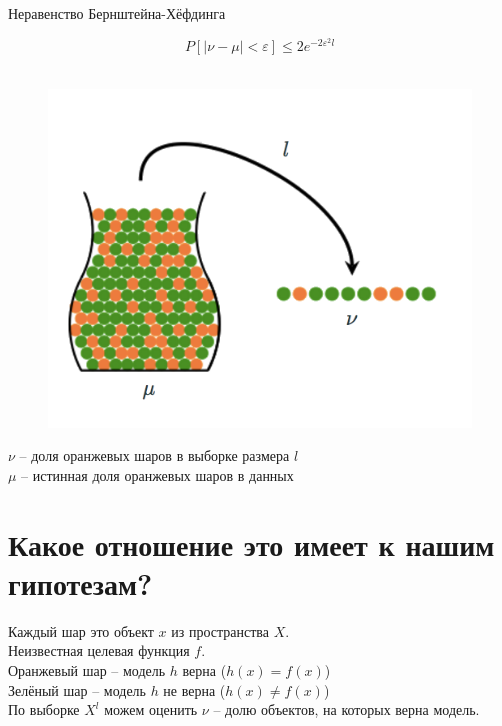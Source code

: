 \documentclass[10pt]{beamer}
\begin{document}
\begin{frame}{Неравенство Бернштейна-Хёфдинга}
  \begin{minipage}[t]{0.5\linewidth}
    $$P[\vert \nu - \mu \vert < \varepsilon ] \leq 2 e^{-2 \varepsilon^2 l} $$\\
  \end{minipage}%
  \begin{minipage}{0.45\textwidth}
    \begin{center}
      \begin{figure}
        \includegraphics[width=\textwidth, keepaspectratio]{images/bin}    
      \end{figure}
    \end{center}

  \end{minipage}%
    \bigbreak
    $\nu$ -- доля оранжевых шаров в выборке размера $l$\\
    $\mu$ -- истинная доля оранжевых шаров в данных 
  
\end{frame}

\section{Какое отношение это имеет к нашим гипотезам?}

\begin{frame}
  Каждый шар это объект $x$ из пространства $X$.\\
  Неизвестная целевая функция $f$.\\
  \bigbreak
  Оранжевый шар -- модель $h$ верна ($h(x) = f(x)$)\\
  Зелёный шар -- модель $h$ не верна ($h(x) \neq f(x)$)\\
  \bigbreak
  По выборке $X^l$ можем оценить $\nu$ -- долю объектов, на которых верна модель.
\end{frame}
\end{document}
